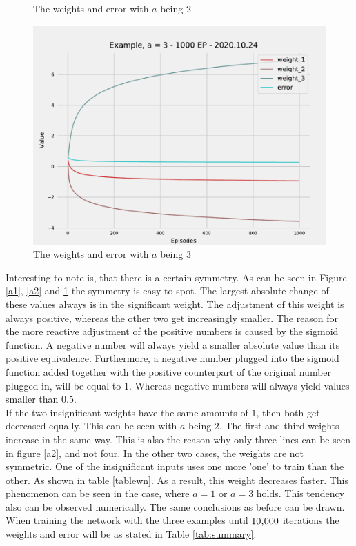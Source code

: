 \documentclass[12pt]{article}
\begin{document}
\begin{figure}
  \caption{The weights and error with $a$ being 2}
    \label{a2}
    \vspace{-10pt}
  \begin{center}
\includegraphics[scale=0.4]{pictures/fig.Example, a = 3 - 1000 EP - 2020.10.24.pdf}
\end{center}
  \vspace{-20pt}
  \caption{The weights and error with $a$ being 3}
    \label{a3}
  \vspace{-10pt}
\end{figure}
Interesting to note is, that there is a certain symmetry. As can be seen in Figure \ref{a1}, \ref{a2} and \ref{a3} the symmetry is easy to spot. The largest absolute change of these values always is in the significant weight. The adjustment of this weight is always positive, whereas the other two get increasingly smaller. The reason for the more reactive adjustment of the positive numbers is caused by the sigmoid function. A negative number will always yield a smaller absolute value than its positive equivalence. Furthermore, a negative number plugged into the sigmoid function added together with the positive counterpart of the original number plugged in, will be equal to $1$. Whereas negative numbers will always yield values smaller than $0.5$.\\ If the two insignificant weights have the same amounts of $1$, then both get decreased equally. This can be seen with $a$ being $2$. The first and third weights increase in the same way. This is also the reason why only three lines can be seen in figure \ref{a2}, and not four. In the other two cases, the weights are not symmetric. One of the insignificant inputs uses one more 'one' to train than the other. As shown in table \ref{tablewn}. As a result, this weight decreases faster. This phenomenon can be seen in the case, where $a = 1$ or $a = 3$ holds. This tendency also can be observed numerically. The same conclusions as before can be drawn. When training the network with the three examples until $10\textsc{\char13}000$ iterations the weights and error will be as stated in Table \ref{tab:summary}. 
\end{document}
